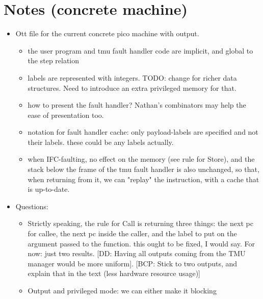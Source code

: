 \documentclass{article}
\newcommand{\comm}[3]{\textcolor{#1}{[#2: #3]}}
\newcommand{\bcp}[1]{\comm{dkred}{BCP}{#1}} %
\newcommand{\dd}[1]{\comm{dkblue}{DD}{#1}} %
\begin{document}
\ottdefnsAbstractExplicitSmallStep

\section*{Notes (concrete machine)}

\renewcommand{\ottdrulename}[1]{\footnotesize\textsc{#1}}
\renewcommand{\ottdrule}[4][]
           {{\displaystyle\frac{\begin{array}{l}#2\end{array}}{#3}
           }}

\begin{itemize}
\item Ott file for the current concrete pico machine with output.
  \begin{itemize}
    \item the user program and tmu fault handler code are implicit,
      and global to the step relation
    \item labels are represented with integers. TODO: change for
      richer data structures. Need to introduce an extra privileged
      memory for that.
    \item how to present the fault handler? Nathan's
      combinators may help the ease of presentation too.
    \item notation for fault handler cache: only payload-labels are
      specified and not their labels. these could be any labels actually.
    \item when IFC-faulting, no effect on the memory (see rule for
      Store), and the stack below the frame of the tmu fault handler
      is also unchanged, so that, when returning from it, we can
      "replay" the instruction, with a cache that is up-to-date.
  \end{itemize}
\item Questions:
  \begin{itemize}
    \item Strictly speaking, the rule for Call is returning three
      things: the next pc for callee, the next pc inside the caller,
      and the label to put on the argument passed to the function.
      this ought to be fixed, I would say. For now: just two results.
      \dd{Having all outputs coming from the TMU manager would be more
        uniform}. \bcp{Stick to two outputs, and explain that in the
        text (less hardware resource usage)}
    \item Output and privileged mode: we can either make it blocking

\end{itemize}
\end{itemize}
\end{document}
